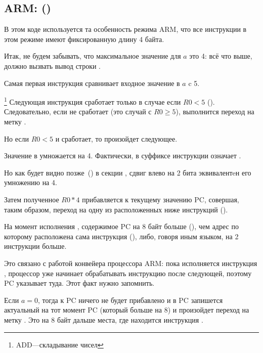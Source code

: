 \subsection{ARM: \OptimizingKeilVI (\ARMMode)}
\label{sec:SwitchARMLot}



В этом коде используется та особенность режима ARM, 
что все инструкции в этом режиме имеют фиксированную длину 4 байта.

Итак, не будем забывать, что максимальное значение для $a$ это 4: всё что выше, должно вызвать
вывод строки .

Самая первая инструкция  сравнивает входное значение в $a$ c 5.

\footnote{ADD---складывание чисел}
Следующая инструкция  сработает только в случае если $R0 < 5$ (). 
Следовательно, если  не сработает (это случай с $R0 \geq 5$), выполнится переход на метку 
.

Но если $R0 < 5$ и  сработает, то произойдет следующее.

Значение в  умножается на 4.
Фактически,  в суффиксе инструкции означает .

Но как будет видно позже~() в секции \q{\ShiftsSectionName}, 
сдвиг влево на 2 бита эквивалентeн его умножению на 4.

Затем полученное $R0*4$ прибавляется к текущему значению \ac{PC}, 
совершая, таким образом, переход на одну из расположенных ниже инструкций  ().

На момент исполнения ,
содержимое \ac{PC} на 8 байт больше (), чем адрес по которому расположена сама инструкция  (), 
либо, говоря иным языком, на 2 инструкции больше.

Это связано с работой конвейера процессора ARM:
пока исполняется инструкция , процессор уже начинает обрабатывать инструкцию после следующей, 
поэтому \ac{PC} указывает туда. Этот факт нужно запомнить.

Если $a=0$, тогда к \ac{PC} ничего не будет прибавлено и 
в \ac{PC} запишется актуальный на тот момент \ac{PC} (который больше на 8) 
и произойдет переход на метку . 
Это на 8 байт дальше места, где находится инструкция .

